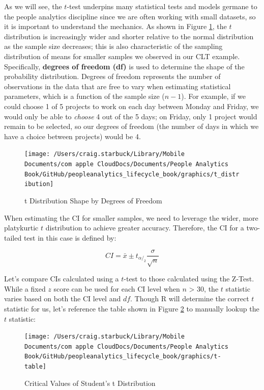 \documentclass[]{book}
\begin{document}
As we will see, the \(t\)-test underpins many statistical tests and models germane to the people analytics discipline since we are often working with small datasets, so it is important to understand the mechanics. As shown in Figure \ref{fig:t-distribution}, the \(t\) distribution is increasingly wider and shorter relative to the normal distribution as the sample size decreases; this is also characteristic of the sampling distribution of means for smaller samples we observed in our CLT example. Specifically, \textbf{degrees of freedom (df)} is used to determine the shape of the probability distribution. Degrees of freedom represents the number of observations in the data that are free to vary when estimating statistical parameters, which is a function of the sample size (\(n - 1\)). For example, if we could choose 1 of 5 projects to work on each day between Monday and Friday, we would only be able to \emph{choose} 4 out of the 5 days; on Friday, only 1 project would remain to be selected, so our degrees of freedom (the number of days in which we have a choice between projects) would be 4.

\begin{figure}

{\centering \texttt{[image: /Users/craig.starbuck/Library/Mobile Documents/com~apple~CloudDocs/Documents/People Analytics Book/GitHub/peopleanalytics\_lifecycle\_book/graphics/t\_distribution]} 

}

\caption{t Distribution Shape by Degrees of Freedom}\label{fig:t-distribution}
\end{figure}

When estimating the CI for smaller samples, we need to leverage the wider, more platykurtic \(t\) distribution to achieve greater accuracy. Therefore, the CI for a two-tailed test in this case is defined by:

\[ CI = \bar{x} \pm t_{\alpha/_2} \frac{\sigma}{\sqrt{n}} \]

Let's compare CIs calculated using a \(t\)-test to those calculated using the Z-Test. While a fixed \(z\) score can be used for each CI level when \(n\) \textgreater{} 30, the \(t\) statistic varies based on both the CI level and \(df\). Though R will determine the correct \(t\) statistic for us, let's reference the table shown in Figure \ref{fig:t-crit} to manually lookup the \(t\) statistic:

\begin{figure}

{\centering \texttt{[image: /Users/craig.starbuck/Library/Mobile Documents/com~apple~CloudDocs/Documents/People Analytics Book/GitHub/peopleanalytics\_lifecycle\_book/graphics/t-table]} 

}

\caption{Critical Values of Student's t Distribution}\label{fig:t-crit}
\end{figure}
\end{document}
